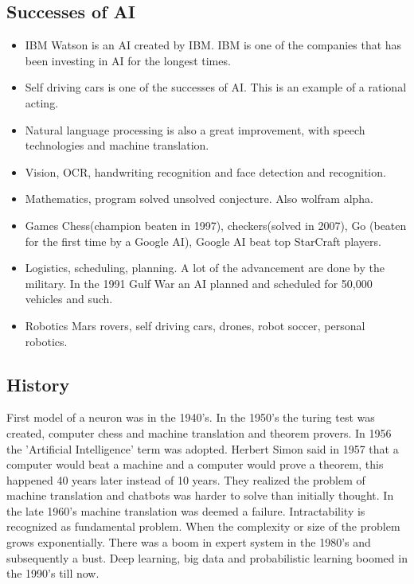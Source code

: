 \documentclass{article}
\begin{document}
\subsection{Successes of AI}
\begin{itemize}
  \item IBM Watson is an AI created by IBM. IBM is one of the companies that has been
investing in AI for the longest times. 
  \item Self driving cars is one of the successes of AI. This is an example of a
  rational acting. 
  \item Natural language processing is also a great improvement, with speech
technologies and machine translation.
  \item Vision, OCR, handwriting recognition and face detection and recognition.
  \item Mathematics, program solved unsolved conjecture. Also wolfram alpha.
  \item Games
    \subitem Chess(champion beaten in 1997), checkers(solved in 2007), Go
    (beaten for the first time by a Google AI), Google AI beat top StarCraft
    players.
  \item Logistics, scheduling, planning.
    \subitem A lot of the advancement are done by the military. In the 1991 Gulf
    War an AI planned and scheduled for 50,000 vehicles and such.
  \item Robotics
    \subitem Mars rovers, self driving cars, drones, robot soccer, personal
    robotics.
\end{itemize}

\subsection{History}
First model of a neuron was in the 1940's. In the 1950's the turing test was
created, computer chess and machine translation and theorem provers. In 1956 the
'Artificial Intelligence' term was adopted. Herbert Simon said in 1957 that a
computer would beat a machine and a computer would prove a theorem, this
happened 40 years later instead of 10 years.
They realized the problem of machine translation and chatbots was harder to
solve than initially thought. In the late 1960's machine translation was deemed
a failure. Intractability is recognized as fundamental problem. When the
complexity or size of the problem grows exponentially.
There was a boom in expert system in the 1980's and subsequently a bust. Deep
learning, big data and probabilistic learning boomed in the 1990's till now.
\end{document}
